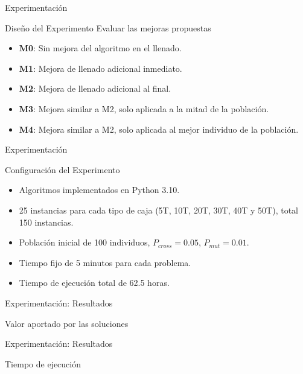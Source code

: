 \documentclass{beamer}
\begin{document}
\begin{frame}{Experimentación}
    \begin{exampleblock}{Diseño del Experimento}
        Evaluar las mejoras propuestas
        \begin{itemize}[<+-| alert@+>]
            \item \textbf{M0}: Sin mejora del algoritmo en el llenado.
            \item \textbf{M1}: Mejora de llenado adicional inmediato.
            \item \textbf{M2}: Mejora de llenado adicional al final.
            \item \textbf{M3}: Mejora similar a M2, solo aplicada a la mitad de la población.
            \item \textbf{M4}: Mejora similar a M2, solo aplicada al mejor individuo de la población.
        \end{itemize}
    \end{exampleblock}
\end{frame}

\begin{frame}{Experimentación}
    \begin{exampleblock}{Configuración del Experimento}
        \begin{itemize}[<+-| alert@+>]
            \item Algoritmos implementados en Python 3.10.
            \item 25 instancias para cada tipo de caja (5T, 10T, 20T, 30T, 40T y 50T), total 150 instancias.
            \item Población inicial de 100 individuos, $P_{cross}=0.05$, $P_{mut}=0.01$.
            \item Tiempo fijo de 5 minutos para cada problema.
            \item Tiempo de ejecución total de 62.5 horas.
        \end{itemize}
    \end{exampleblock}
\end{frame}

\begin{frame}{Experimentación: Resultados}
    \begin{exampleblock}{Valor aportado por las soluciones}

    \end{exampleblock}
\end{frame}

\begin{frame}{Experimentación: Resultados}
    \begin{exampleblock}{Tiempo de ejecución}

    \end{exampleblock}
\end{frame}
\end{document}
